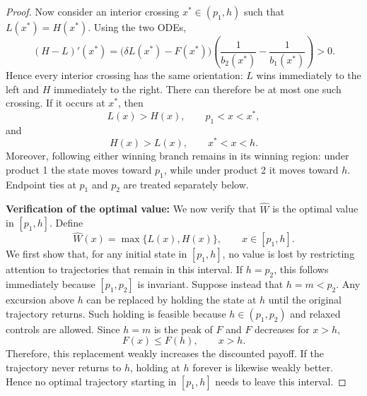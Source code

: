 \documentclass[11pt]{article}
\begin{document}
\begin{proof}
Now consider an interior crossing $x^*\in(p_1,h)$ such that
$L(x^*)=H(x^*)$. Using the two ODEs,
\begin{equation*}
       (H-L)'(x^*)=\bigl(\delta L(x^*)-F(x^*)\bigr)\left(\frac{1}{b_2(x^*)}-\frac{1}{b_1(x^*)}\right)>0.
\end{equation*}
Hence every interior crossing has the same orientation: $L$ wins immediately to the left and $H$ immediately to the right. There can therefore be at most one such crossing. If it occurs at $x^*$, then
\begin{equation*}
       L(x)>H(x),\qquad p_1<x<x^*,
\end{equation*}
and
\begin{equation*}
       H(x)>L(x),\qquad x^*<x<h.
\end{equation*}
Moreover, following either winning branch remains in its winning region: under product 1 the state moves toward $p_1$, while under product 2 it moves toward $h$. Endpoint ties at $p_1$ and $p_2$ are treated separately below.


\noindent\medskip\textbf{Verification of the optimal value:}
We now verify that $\widehat W$ is the optimal value in $[p_1,h]$. Define
\begin{equation*}
    \widehat W(x)=\max\{L(x),H(x)\},
    \qquad x\in[p_1,h].
\end{equation*}
We first show that, for any initial state in $[p_1,h]$, no value is lost by restricting attention to trajectories that remain in this interval. If $h=p_2$, this follows immediately because $[p_1,p_2]$ is invariant. Suppose instead that
$h=m<p_2$. Any excursion above $h$ can be replaced by holding the state at $h$ until the original trajectory returns. Such holding is feasible because $h\in(p_1,p_2)$ and relaxed controls are allowed. Since $h=m$ is the peak
of $F$ and $F$ decreases for $x>h$,
\begin{equation*}
    F(x)\leq F(h),\qquad x>h.
\end{equation*}
Therefore, this replacement weakly increases the discounted payoff. If the trajectory never returns to $h$, holding at $h$ forever is likewise weakly better. Hence no optimal trajectory starting in $[p_1,h]$ needs to leave
this interval.


\end{proof}
\end{document}
